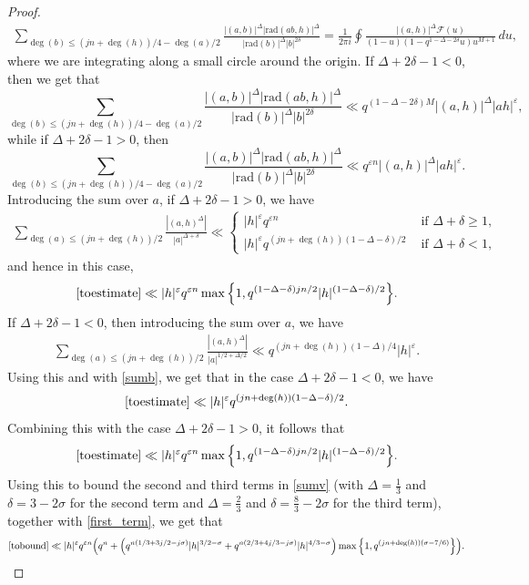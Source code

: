 \documentclass[12pt]{amsart}
\begin{document}
\begin{proof}
\begin{align*}
\sum_{\deg(b) \leq (jn+\deg(h))/4-\deg(a)/2} \frac{|(a,b)|^{\Delta}|\text{rad}(ab,h)|^{\Delta}}{|\text{rad}(b)|^{\Delta} |b|^{2\delta}} = \frac{1}{2 \pi i} \oint \frac{ |(a,h)|^{\Delta} \mathcal{F}(u)}{(1-u)  (1-q^{1-\Delta-2\delta}u)u^{M+1}} \, du,
\end{align*}
where we are integrating along a small circle around the origin. If $\Delta+2\delta-1<0$, then we get that
\begin{equation}
\label{sumb}
\sum_{\deg(b) \leq (jn+\deg(h))/4-\deg(a)/2} \frac{|(a,b)|^{\Delta}|\text{rad}(ab,h)|^{\Delta}}{|\text{rad}(b)|^{\Delta} |b|^{2\delta}}  \ll q^{(1-\Delta-2\delta)M} |(a,h)|^{\Delta} |ah|^{\varepsilon},
\end{equation} while if $\Delta+2\delta-1>0$, then
$$\sum_{\deg(b) \leq (jn+\deg(h))/4-\deg(a)/2} \frac{|(a,b)|^{\Delta}|\text{rad}(ab,h)|^{\Delta}}{|\text{rad}(b)|^{\Delta} |b|^{2\delta}}  \ll q^{\varepsilon n} |(a,h)|^{\Delta} |ah|^{\varepsilon}. $$
Introducing the sum over $a$, if $\Delta+2\delta-1>0$, we have
\begin{align*}
\sum_{\deg(a) \leq (jn+\deg(h))/2} \frac{|(a,h)^{\Delta}|}{|a|^{\Delta+\delta}} \ll 
\begin{cases}
|h|^{\varepsilon} q^{\varepsilon n} & \mbox{ if } \Delta+\delta \geq 1, \\
|h|^{\varepsilon} q^{(jn+\deg(h))(1-\Delta-\delta)/2} & \mbox{ if } \Delta+\delta <1,
\end{cases}
\end{align*}
and hence in this case,
$$ \eqref{toestimate} \ll |h|^\varepsilon q^{\varepsilon n}   \max \Big\{1, q^{(1-\Delta-\delta)jn/2} |h|^{(1-\Delta-\delta)/2} \Big\}.$$
If $\Delta+2\delta-1<0$, then introducing the sum over $a$, we have
\begin{align*}
\sum_{\deg(a) \leq (jn+\deg(h))/2} \frac{|(a,h)^{\Delta}|}{|a|^{1/2+\Delta/2}} \ll q^{(jn+\deg(h))(1-\Delta)/4} |h|^{\varepsilon}.
\end{align*}
Using this and with \eqref{sumb}, we get that in the case $\Delta+2\delta-1<0$, we have
$$ \eqref{toestimate} \ll |h|^{\varepsilon}  q^{(jn+\deg(h))(1-\Delta-\delta)/2} .$$
Combining this with the case $\Delta+2\delta-1>0$, it follows that
\begin{align}
\eqref{toestimate} \ll |h|^\varepsilon q^{\varepsilon n}   \max \Big\{1, q^{(1-\Delta-\delta)jn/2} |h|^{(1-\Delta-\delta)/2} \Big\}.\label{Deltadelta}
\end{align}
Using this to bound the second and third terms in \eqref{sumv} (with $\Delta=\frac{1}{3}$ and $\delta={3-2\sigma}$ for the second term and $\Delta=\frac{2}{3}$ and $\delta=\frac{8}{3}-2\sigma$ for the third term), together with \eqref{first_term}, we get that
 \begin{align*}
 \eqref{tobound} \ll |h|^{\varepsilon} q^{\varepsilon n} \Big( q^n +\Big(q^{n(1/3+3j/2-j\sigma)}|h|^{3/2-\sigma}+q^{n(2/3+4j/3-j\sigma)}|h|^{4/3-\sigma}\Big)  \max \Big\{1, q^{(jn+\deg(h))(\sigma-7/6)} \Big\} \Big).
 \end{align*}


\end{proof}
\end{document}
